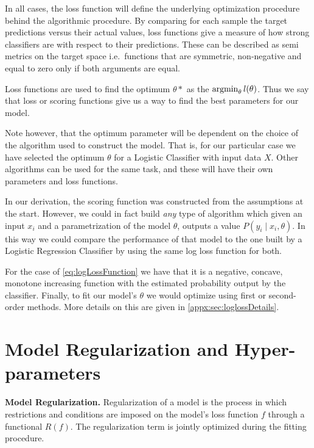 In all cases, the loss function will define the underlying optimization procedure behind the algorithmic procedure.
By comparing for each sample the target predictions versus their actual values, loss functions give a measure of how strong classifiers are with respect to their predictions.
These can be described as semi metrics on the target space i.e.\ functions that are symmetric, non-negative and equal to zero only if both arguments are equal.

Loss functions are used to find the optimum $\theta*$ as the $\operatorname*{argmin}_{\theta} l(\theta) $.
Thus we say that loss or scoring functions give us a way to find the best parameters for our model.

Note however, that the optimum parameter will be dependent on the choice of the algorithm used to construct the model.
That is, for our particular case we have selected the optimum $\theta$ for a Logistic Classifier with input data $X$.
Other algorithms can be used for the same task, and these will have their own parameters and loss functions.

In our derivation, the scoring function was constructed from the assumptions at the start.
However, we could in fact build \textit{any} type of algorithm which given an input $x_i$ and a parametrization of the model $\theta$, outputs a value $P(y_i \mid x_i,\theta)$.
In this way we could compare the performance of that model to the one built by a Logistic Regression Classifier by using the same log loss function for both.

For the case of \cref{eq:logLossFunction} we have that it is a negative, concave, monotone increasing function with the estimated probability output by the classifier.
Finally, to fit our model's $\theta$ we would optimize using first or second-order methods. More details on this are given in \cref{appx:sec:loglossDetails}.



\section{Model Regularization and Hyper-parameters}\label{section-hyperParametersRegularization}


\begin{definition}\textbf{Model Regularization.}
Regularization of a model is the process in which restrictions and conditions are imposed on the model's loss function $f$ through a functional $ R(f)$.
The regularization term is jointly optimized during the fitting procedure.
\end{definition}

